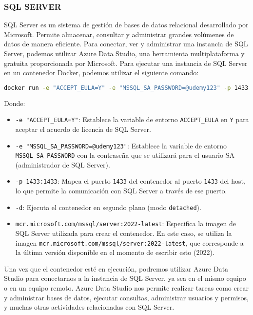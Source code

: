 \documentclass{article}
\begin{document}
\subsubsection*{SQL SERVER}
SQL Server es un sistema de gestión de bases de datos relacional desarrollado por Microsoft. Permite almacenar, consultar y administrar grandes volúmenes de datos de manera eficiente. Para conectar, ver y administrar una instancia de SQL Server, podemos utilizar Azure Data Studio, una herramienta multiplataforma y gratuita proporcionada por Microsoft. Para ejecutar una instancia de SQL Server en un contenedor Docker, podemos utilizar el siguiente comando:

\begin{lstlisting}[language=bash]
docker run -e "ACCEPT_EULA=Y" -e "MSSQL_SA_PASSWORD=@udemy123" -p 1433:1433 -d mcr.microsoft.com/mssql/server:2022-latest
\end{lstlisting}

Donde:

\begin{itemize}
\item \lstinline{-e "ACCEPT_EULA=Y"}: Establece la variable de entorno \lstinline{ACCEPT_EULA} en \lstinline{Y} para aceptar el acuerdo de licencia de SQL Server.
\item \lstinline{-e "MSSQL_SA_PASSWORD=@udemy123"}: Establece la variable de entorno \lstinline{MSSQL_SA_PASSWORD} con la contraseña que se utilizará para el usuario SA (administrador de SQL Server).
\item \lstinline{-p 1433:1433}: Mapea el puerto \texttt{1433} del contenedor al puerto \lstinline{1433} del host, lo que permite la comunicación con SQL Server a través de ese puerto.
\item \lstinline{-d}: Ejecuta el contenedor en segundo plano (modo \lstinline{detached}).
\item \lstinline{mcr.microsoft.com/mssql/server:2022-latest}: Especifica la imagen de SQL Server utilizada para crear el contenedor. En este caso, se utiliza la imagen \lstinline{mcr.microsoft.com/mssql/server:2022-latest}, que corresponde a la última versión disponible en el momento de escribir esto (2022).
\end{itemize}

Una vez que el contenedor esté en ejecución, podremos utilizar Azure Data Studio para conectarnos a la instancia de SQL Server, ya sea en el mismo equipo o en un equipo remoto. Azure Data Studio nos permite realizar tareas como crear y administrar bases de datos, ejecutar consultas, administrar usuarios y permisos, y muchas otras actividades relacionadas con SQL Server.
\end{document}

